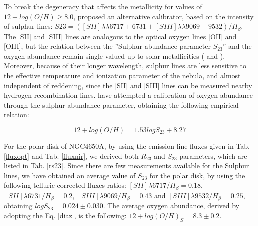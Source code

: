 \documentclass[12pt,preprint]{aastex}
\begin{document}
To break the degeneracy that affects the metallicity for values of
$12 + log(O/H) \geq 8.0$, \citet{Diaz00} proposed an alternative
calibrator, based on the intensity of sulphur lines: $S23=
([SII]{\lambda}{\lambda} 6717 + 6731 + [SIII]{\lambda}{\lambda}
9069 + 9532)/H_{\beta}$. The [SII] and [SIII] lines are analogous
to the optical oxygen lines [OII] and [OIII], but the relation
between the ''Sulphur abundance parameter $S_{23}$'' and the
oxygen abundance remain single valued up to solar metallicities
(\citealt{Diaz00} and \citealt{Per05}). Moreover, because of their
longer wavelength, sulphur lines are less sensitive to the
effective temperature and ionization parameter of the nebula, and
almost independent of reddening, since the [SII] and [SIII] lines
can be measured nearby hydrogen recombination lines.
\citet{Diaz00} have attempted a calibration of oxygen abundance
through the sulphur abundance parameter, obtaining the
following empirical relation:

\begin{equation}\label{diaz}
12 + log(O/H) = 1.53log S_{23}+8.27
\end{equation}

For the polar disk of NGC4650A, by using the emission line fluxes
given in Tab. \ref{fluxopt} and Tab. \ref{fluxnir}, we derived both
$R_{23}$ and $S_{23}$ parameters, which are listed in
Tab. \ref{rs23}. Since there are few measurements available for the
Sulphur lines, we have obtained an average value of $S_{23}$ for the
polar disk, by using the following telluric corrected fluxes ratios: $[SII]\lambda 6717/H_{\beta} = 0.18$,
$[SII]\lambda 6731/H_{\beta} = 0.2$, $[SIII]\lambda 9069/H_{\beta} = 0.43$ and
$[SIII]\lambda 9532/H_{\beta} = 0.25$, obtaining $log S_{23} = 0.024 \pm 0.030$.  The average oxygen
abundance, derived by adopting the Eq. \ref{diaz}, is the following:
$12+log(O/H)_{S} = 8.3 \pm 0.2$.
\end{document}
